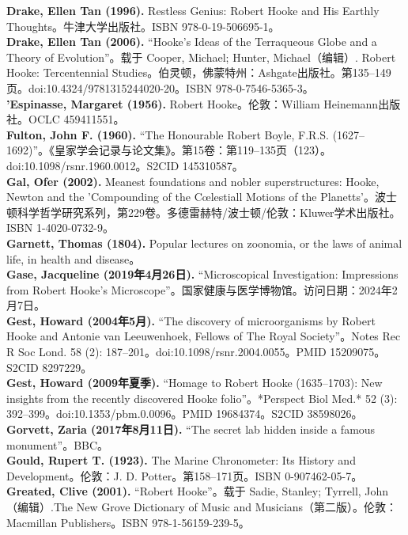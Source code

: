 \textbf{Drake, Ellen Tan (1996).} Restless Genius: Robert Hooke and His Earthly Thoughts。牛津大学出版社。ISBN 978-0-19-506695-1。\\
\textbf{Drake, Ellen Tan (2006).} “Hooke's Ideas of the Terraqueous Globe and a Theory of Evolution”。载于 Cooper, Michael; Hunter, Michael（编辑）. Robert Hooke: Tercentennial Studies。伯灵顿，佛蒙特州：Ashgate出版社。第135–149页。doi:10.4324/9781315244020-20。ISBN 978-0-7546-5365-3。\\
\textbf{'Espinasse, Margaret (1956).} Robert Hooke。伦敦：William Heinemann出版社。OCLC 459411551。\\
\textbf{Fulton, John F. (1960).} “The Honourable Robert Boyle, F.R.S. (1627–1692)”。《皇家学会记录与论文集》。第15卷：第119–135页（123）。doi:10.1098/rsnr.1960.0012。S2CID 145310587。\\
\textbf{Gal, Ofer (2002).} Meanest foundations and nobler superstructures: Hooke, Newton and the 'Compounding of the Cœlestiall Motions of the Planetts'。波士顿科学哲学研究系列，第229卷。多德雷赫特/波士顿/伦敦：Kluwer学术出版社。ISBN 1-4020-0732-9。\\
\textbf{Garnett, Thomas (1804).} Popular lectures on zoonomia, or the laws of animal life, in health and disease。\\
\textbf{Gase, Jacqueline (2019年4月26日).} “Microscopical Investigation: Impressions from Robert Hooke's Microscope”。国家健康与医学博物馆。访问日期：2024年2月7日。\\ 
\textbf{Gest, Howard (2004年5月). }“The discovery of microorganisms by Robert Hooke and Antonie van Leeuwenhoek, Fellows of The Royal Society”。Notes Rec R Soc Lond. 58 (2): 187–201。doi:10.1098/rsnr.2004.0055。PMID 15209075。S2CID 8297229。\\
\textbf{Gest, Howard (2009年夏季). }“Homage to Robert Hooke (1635–1703): New insights from the recently discovered Hooke folio”。*Perspect Biol Med.* 52 (3): 392–399。doi:10.1353/pbm.0.0096。PMID 19684374。S2CID 38598026。\\ 
\textbf{Gorvett, Zaria (2017年8月11日).} “The secret lab hidden inside a famous monument”。BBC。\\
\textbf{Gould, Rupert T. (1923).} The Marine Chronometer: Its History and Development。伦敦：J. D. Potter。第158–171页。ISBN 0-907462-05-7。\\
\textbf{Greated, Clive (2001).} “Robert Hooke”。载于 Sadie, Stanley; Tyrrell, John（编辑）.The New Grove Dictionary of Music and Musicians（第二版）。伦敦：Macmillan Publishers。ISBN 978-1-56159-239-5。\\

